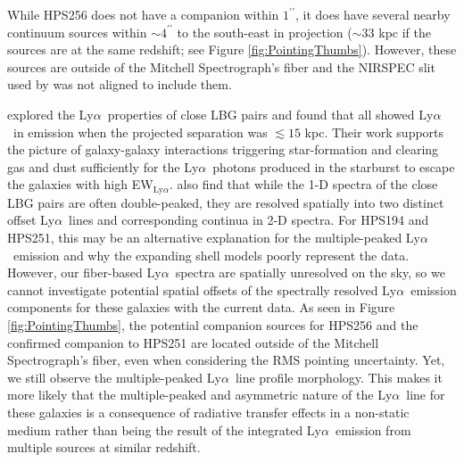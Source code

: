 \documentclass{emulateapj}
\newcommand{\lya}{Ly$\alpha$}
\def\arcsec{^{\prime\prime}}
\def\ewlya{EW$_{\mathrm{Ly}\alpha}$}
\begin{document}
While HPS256 does not have a companion within $1\arcsec$, it does have several nearby continuum sources within $\sim4\arcsec$ to the south-east in projection ($\sim33$ kpc if the sources are at the same redshift; see Figure \ref{fig:PointingThumbs}). However, these sources are outside of the Mitchell Spectrograph's fiber and the NIRSPEC slit used by \citet{finkelstein2011} was not aligned to include them. 

\citet{cooke2010} explored the \lya\ properties of close LBG pairs and found that all showed \lya\ in emission when the projected separation was $\lesssim 15$ kpc. Their work supports the picture of galaxy-galaxy interactions triggering star-formation and clearing gas and dust sufficiently for the \lya\ photons produced in the starburst to escape the galaxies with high \ewlya. \citet{cooke2010} also find that while the 1-D spectra of the close LBG pairs are often double-peaked, they are resolved spatially into two distinct offset \lya\ lines and corresponding continua in 2-D spectra. For HPS194 and HPS251, this may be an alternative explanation for the multiple-peaked \lya\ emission and why the expanding shell models poorly represent the data. However, our fiber-based \lya\ spectra are spatially unresolved on the sky, so we cannot investigate potential spatial offsets of the spectrally resolved \lya\ emission components for these galaxies with the current data. As seen in Figure \ref{fig:PointingThumbs}, the potential companion sources for HPS256 and the confirmed companion to HPS251 are located outside of the Mitchell Spectrograph's fiber, even when considering the RMS pointing uncertainty. Yet, we still observe the multiple-peaked \lya\ line profile morphology. This makes it more likely that the multiple-peaked and asymmetric nature of the \lya\ line for these galaxies is a consequence of radiative transfer effects in a non-static medium rather than being the result of the integrated \lya\ emission from multiple sources at similar redshift. 
\end{document}
